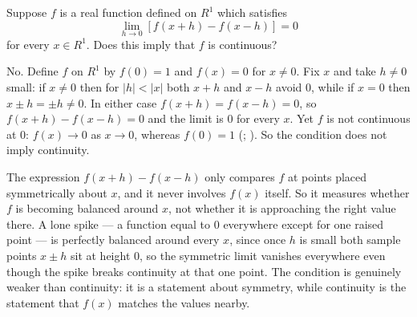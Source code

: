 \documentclass[main.tex]{subfiles}
\begin{document}
Suppose $f$ is a real function defined on $R^{1}$ which satisfies
\[
\lim_{h\to 0} [f(x+h) - f(x-h)] = 0
\]
for every $x \in R^{1}$. Does this imply that $f$ is continuous?
\begin{Solution}
No. Define $f$ on $R^{1}$ by $f(0) = 1$ and $f(x) = 0$ for $x \ne 0$. Fix $x$ and take $h \ne 0$ small: if $x \ne 0$ then for $|h| < |x|$ both $x+h$ and $x-h$ avoid $0$, while if $x = 0$ then $x \pm h = \pm h \ne 0$. In either case $f(x+h) = f(x-h) = 0$, so $f(x+h) - f(x-h) = 0$ and the limit is $0$ for every $x$. Yet $f$ is not continuous at $0$: $f(x) \to 0$ as $x \to 0$, whereas $f(0) = 1$ (; ). So the condition does not imply continuity.
\end{Solution}
\begin{Reflection}
The expression $f(x+h) - f(x-h)$ only compares $f$ at points placed symmetrically about $x$, and it never involves $f(x)$ itself. So it measures whether $f$ is becoming balanced around $x$, not whether it is approaching the right value there. A lone spike --- a function equal to $0$ everywhere except for one raised point --- is perfectly balanced around every $x$, since once $h$ is small both sample points $x \pm h$ sit at height $0$, so the symmetric limit vanishes everywhere even though the spike breaks continuity at that one point. The condition is genuinely weaker than continuity: it is a statement about symmetry, while continuity is the statement that $f(x)$ matches the values nearby.
\end{Reflection}
\end{document}

